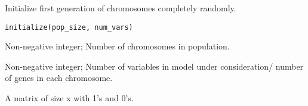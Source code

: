 %
\begin{Description}\relax
Initialize first generation of chromosomes completely randomly.
\end{Description}
%
\begin{Usage}
\begin{verbatim}
initialize(pop_size, num_vars)
\end{verbatim}
\end{Usage}
%
\begin{Arguments}
\begin{ldescription}
\item[\code{pop\_size}] Non-negative integer; Number of chromosomes in population.

\item[\code{num\_vars}] Non-negative integer; Number of variables in model under consideration/
number of genes in each chromosome.
\end{ldescription}
\end{Arguments}
%
\begin{Value}
A matrix of size  x  with 1's and 0's.
\end{Value}
